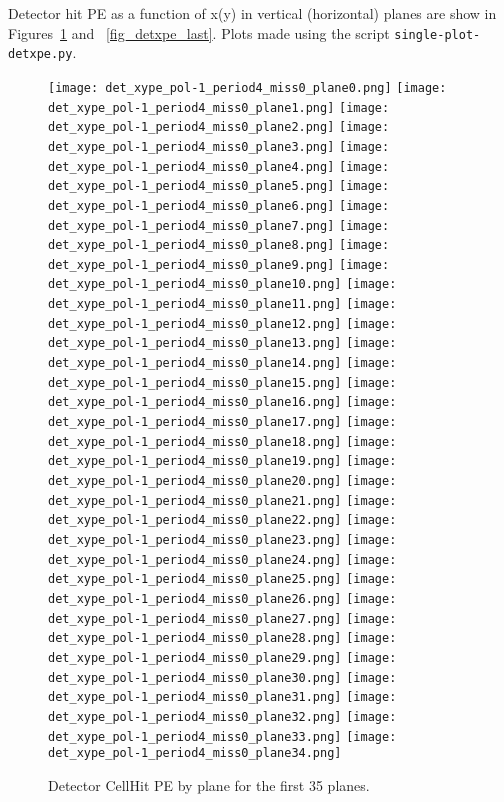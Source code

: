   
  Detector hit PE as a function of x(y) in vertical (horizontal) planes are show in Figures~\ref{fig_detxpe_first} and ~\ref{fig_detxpe_last}. Plots made using the script \texttt{single-plot-detxpe.py}.
  
        \begin{figure}[h]	   
 \centering
        	\texttt{[image: det\_xype\_pol-1\_period4\_miss0\_plane0.png]}
	 	\texttt{[image: det\_xype\_pol-1\_period4\_miss0\_plane1.png]}
		 	\texttt{[image: det\_xype\_pol-1\_period4\_miss0\_plane2.png]}
			 	\texttt{[image: det\_xype\_pol-1\_period4\_miss0\_plane3.png]}
				\texttt{[image: det\_xype\_pol-1\_period4\_miss0\_plane4.png]}	 
        	\texttt{[image: det\_xype\_pol-1\_period4\_miss0\_plane5.png]}
	 	\texttt{[image: det\_xype\_pol-1\_period4\_miss0\_plane6.png]}
		 	\texttt{[image: det\_xype\_pol-1\_period4\_miss0\_plane7.png]}
			 	\texttt{[image: det\_xype\_pol-1\_period4\_miss0\_plane8.png]}
				\texttt{[image: det\_xype\_pol-1\_period4\_miss0\_plane9.png]}					
        	\texttt{[image: det\_xype\_pol-1\_period4\_miss0\_plane10.png]}
	 	\texttt{[image: det\_xype\_pol-1\_period4\_miss0\_plane11.png]}
		 	\texttt{[image: det\_xype\_pol-1\_period4\_miss0\_plane12.png]}
			 	\texttt{[image: det\_xype\_pol-1\_period4\_miss0\_plane13.png]}
				\texttt{[image: det\_xype\_pol-1\_period4\_miss0\_plane14.png]}
        	\texttt{[image: det\_xype\_pol-1\_period4\_miss0\_plane15.png]}
	 	\texttt{[image: det\_xype\_pol-1\_period4\_miss0\_plane16.png]}
		 	\texttt{[image: det\_xype\_pol-1\_period4\_miss0\_plane17.png]}
			 	\texttt{[image: det\_xype\_pol-1\_period4\_miss0\_plane18.png]}
				\texttt{[image: det\_xype\_pol-1\_period4\_miss0\_plane19.png]}
        	\texttt{[image: det\_xype\_pol-1\_period4\_miss0\_plane20.png]}
	 	\texttt{[image: det\_xype\_pol-1\_period4\_miss0\_plane21.png]}
		 	\texttt{[image: det\_xype\_pol-1\_period4\_miss0\_plane22.png]}
			 	\texttt{[image: det\_xype\_pol-1\_period4\_miss0\_plane23.png]}
				\texttt{[image: det\_xype\_pol-1\_period4\_miss0\_plane24.png]}
        	\texttt{[image: det\_xype\_pol-1\_period4\_miss0\_plane25.png]}
	 	\texttt{[image: det\_xype\_pol-1\_period4\_miss0\_plane26.png]}
		 	\texttt{[image: det\_xype\_pol-1\_period4\_miss0\_plane27.png]}
			 	\texttt{[image: det\_xype\_pol-1\_period4\_miss0\_plane28.png]}
				\texttt{[image: det\_xype\_pol-1\_period4\_miss0\_plane29.png]}
         	\texttt{[image: det\_xype\_pol-1\_period4\_miss0\_plane30.png]}
	 	\texttt{[image: det\_xype\_pol-1\_period4\_miss0\_plane31.png]}
		 	\texttt{[image: det\_xype\_pol-1\_period4\_miss0\_plane32.png]}
			 	\texttt{[image: det\_xype\_pol-1\_period4\_miss0\_plane33.png]}
				\texttt{[image: det\_xype\_pol-1\_period4\_miss0\_plane34.png]}
   \caption[short]{Detector CellHit PE by plane for the first 35 planes.}
   \label{fig_detxpe_first}
  \end{figure}
  
